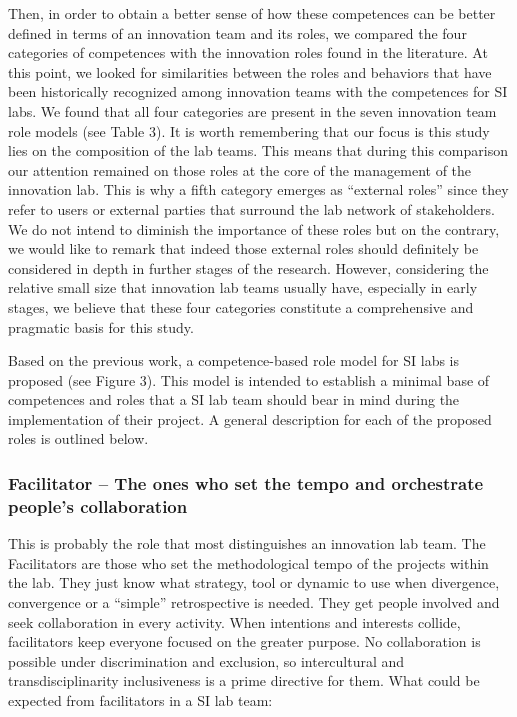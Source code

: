 \documentclass[AMA,STIX1COL,APA,STIX2COL]{WileyNJD-v2}
\begin{document}
Then, in order to obtain a better sense of how these competences can be
better defined in terms of an innovation team and its roles, we compared
the four categories of competences with the innovation roles found in
the literature. At this point, we looked for similarities between the
roles and behaviors that have been historically recognized among
innovation teams with the competences for SI labs. We found that all
four categories are present in the seven innovation team role models
(see Table 3). It is worth remembering that our focus is this study lies
on the composition of the lab teams. This means that during this
comparison our attention remained on those roles at the core of the
management of the innovation lab. This is why a fifth category emerges
as ``external roles'' since they refer to users or external parties that
surround the lab network of stakeholders. We do not intend to diminish
the importance of these roles but on the contrary, we would like to
remark that indeed those external roles should definitely be considered
in depth in further stages of the research. However, considering the
relative small size that innovation lab teams usually have, especially
in early stages, we believe that these four categories constitute a
comprehensive and pragmatic basis for this study.

Based on the previous work, a competence-based role model for SI labs is
proposed (see Figure 3). This model is intended to establish a minimal
base of competences and roles that a SI lab team should bear in mind
during the implementation of their project. A general description for
each of the proposed roles is outlined below.

\hypertarget{facilitator-the-ones-who-set-the-tempo-and-orchestrate-peoples-collaboration}{%
\subsubsection{Facilitator -- The ones who set the tempo and orchestrate
people's
collaboration}\label{facilitator-the-ones-who-set-the-tempo-and-orchestrate-peoples-collaboration}}

This is probably the role that most distinguishes an innovation lab
team. The Facilitators are those who set the methodological tempo of the
projects within the lab. They just know what strategy, tool or dynamic
to use when divergence, convergence or a ``simple'' retrospective is
needed. They get people involved and seek collaboration in every
activity. When intentions and interests collide, facilitators keep
everyone focused on the greater purpose. No collaboration is possible
under discrimination and exclusion, so intercultural and
transdisciplinarity inclusiveness is a prime directive for them. What
could be expected from facilitators in a SI lab team:
\end{document}
